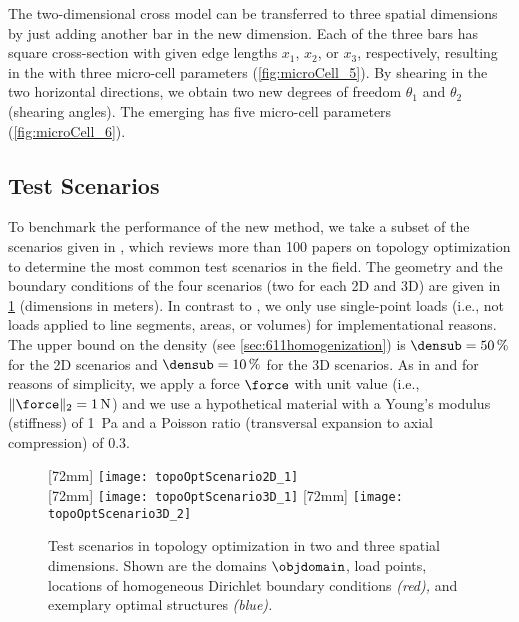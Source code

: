 The two-dimensional cross model can be transferred to three
spatial dimensions by just adding another bar in the new dimension.
Each of the three bars has square cross-section with given edge lengths
$x_1$, $x_2$, or $x_3$, respectively,
resulting in the  with three micro-cell parameters
(\cref{fig:microCell_5}).
By shearing in the two horizontal directions,
we obtain two new degrees of freedom $\theta_1$ and $\theta_2$
(shearing angles).
The emerging  has five micro-cell parameters
(\cref{fig:microCell_6}).



\subsection{Test Scenarios}
\label{sec:632scenarios}


To benchmark the performance of the new method,
we take a subset of the scenarios given in \cite{Valdez17Topology},
which reviews more than 100 papers on topology optimization
to determine the most common test scenarios in the field.
The geometry and the boundary conditions of the
four scenarios (two for each 2D and 3D)
are given in \cref{fig:topoOptScenario} (dimensions in meters).
In contrast to \cite{Valdez17Topology},
we only use single-point loads
(i.e., not loads applied to line segments, areas, or volumes)
for implementational reasons.
The upper bound on the density (see \cref{sec:611homogenization})
is $\densub = \SI{50}{\percent}$ for the 2D scenarios and
$\densub = \SI{10}{\percent}$ for the 3D scenarios.
As in \cite{Sigmund01Line} and for reasons of simplicity,
we apply a force $\force$ with unit value
(i.e., $\norm[2]{\force} = \SI{1}{\newton}$)
and we use a hypothetical material with
a Young's modulus (stiffness) of \SI{1}{\pascal} and
a Poisson ratio (transversal expansion to axial compression) of $0.3$.

\begin{figure}
  [72mm]{%
    \texttt{[image: topoOptScenario2D\_1]}%
  }%
  \hfill%
  \\[7mm]%
  [72mm]{%
    \texttt{[image: topoOptScenario3D\_1]}%
  }%
  \hfill%
  [72mm]{%
    \texttt{[image: topoOptScenario3D\_2]}%
  }%
  \caption[Test scenarios in topology optimization]{%
    Test scenarios in topology optimization in
    two and three spatial dimensions.
    Shown are
    the domains $\objdomain$,
    load points,
    locations of homogeneous Dirichlet boundary conditions
    \emph{\textcolor{C1}{(red)},} and
    exemplary optimal structures \emph{\textcolor{C0}{(blue)}.}%
  }%
  \label{fig:topoOptScenario}%
\end{figure}

